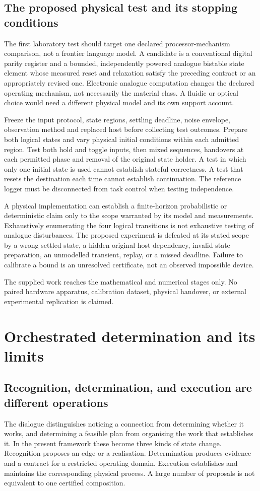 \documentclass[11pt,a4paper]{article}
\theoremstyle{definition}
\theoremstyle{remark}
\begin{document}
\subsection{The proposed physical test and its stopping conditions}\label{subsec:physicaltest}
The first laboratory test should target one declared processor-mechanism comparison, not a frontier language model. A candidate is a conventional digital parity register and a bounded, independently powered analogue bistable state element whose measured reset and relaxation satisfy the preceding contract or an appropriately revised one. Electronic analogue computation changes the declared operating mechanism, not necessarily the material class. A fluidic or optical choice would need a different physical model and its own support account.

Freeze the input protocol, state regions, settling deadline, noise envelope, observation method and replaced host before collecting test outcomes. Prepare both logical states and vary physical initial conditions within each admitted region. Test both hold and toggle inputs, then mixed sequences, handovers at each permitted phase and removal of the original state holder. A test in which only one initial state is used cannot establish stateful correctness. A test that resets the destination each time cannot establish continuation. The reference logger must be disconnected from task control when testing independence.

A physical implementation can establish a finite-horizon probabilistic or deterministic claim only to the scope warranted by its model and measurements. Exhaustively enumerating the four logical transitions is not exhaustive testing of analogue disturbances. The proposed experiment is defeated at its stated scope by a wrong settled state, a hidden original-host dependency, invalid state preparation, an unmodelled transient, replay, or a missed deadline. Failure to calibrate a bound is an unresolved certificate, not an observed impossible device.

The supplied work reaches the mathematical and numerical stages only. No paired hardware apparatus, calibration dataset, physical handover, or external experimental replication is claimed.


\section{Orchestrated determination and its limits}\label{sec:discovery}
\subsection{Recognition, determination, and execution are different operations}
The dialogue distinguishes noticing a connection from determining whether it works, and determining a feasible plan from organising the work that establishes it. In the present framework these become three kinds of state change. Recognition proposes an edge or a realisation. Determination produces evidence and a contract for a restricted operating domain. Execution establishes and maintains the corresponding physical process. A large number of proposals is not equivalent to one certified composition.
\end{document}

